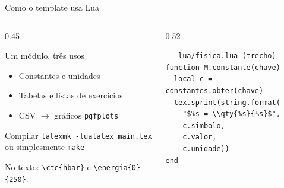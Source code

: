 \begin{frame}[fragile]{Como o template usa Lua}
  \begin{columns}[T,onlytextwidth]
    \begin{column}{0.45\textwidth}
      \begin{destaque}{Um módulo, três usos}
        \begin{itemize}
          \item Constantes e unidades
          \item Tabelas e listas de exercícios
          \item CSV $\rightarrow$ gráficos \texttt{pgfplots}
        \end{itemize}
      \end{destaque}
      \begin{destaque}[fisicaviolet]{Compilar}
        \small
        \texttt{latexmk -lualatex main.tex}\\[2pt]
        ou simplesmente \texttt{make}
      \end{destaque}
      {\scriptsize\color{fisicamuted}%
       No texto: \texttt{\textbackslash cte\{hbar\}} e
       \texttt{\textbackslash energia\{0\}\{250\}}.}
    \end{column}
    \begin{column}{0.52\textwidth}
      \begin{lstlisting}[style=lua]
-- lua/fisica.lua (trecho)
function M.constante(chave)
  local c = constantes.obter(chave)
  tex.sprint(string.format(
    "$%s = \\qty{%s}{%s}$",
    c.simbolo,
    c.valor,
    c.unidade))
end
      \end{lstlisting}
    \end{column}
  \end{columns}
\end{frame}
